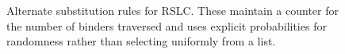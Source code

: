 \documentclass[10pt]{sigplanconf}
\begin{document}
\begin{figure}[t]
	\TypeRules{
		\SullyLamCapture \qquad \SullyLam \qquad \SullyApp \\
		\SullyVarXA \qquad \SullyVarXB \qquad \SullyVarY \\
		\SullyCaseCapture \\ \SullyCase \\
		\SullyZero \qquad \SullySuc \\
		\SullyLetCapture \qquad \SullyLet
	}
	\caption{Alternate substitution rules for RSLC. These maintain a counter for the number of binders traversed and uses explicit probabilities for randomness rather than selecting uniformly from a list.}
	\label{fig:sully}
\end{figure}
\end{document}
